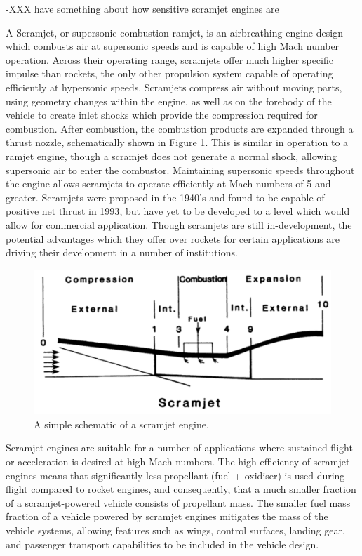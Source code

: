    -XXX have something about how sensitive scramjet engines are
    
    A Scramjet, or supersonic combustion ramjet, is an airbreathing engine design which combusts air at supersonic speeds and is capable of high Mach number operation. 
    Across their operating range, scramjets offer much higher specific impulse than rockets, the only other propulsion system capable of operating efficiently at hypersonic speeds\cite{Billig1993,Cook2003}.
    Scramjets compress air without moving parts, using geometry changes within the engine\cite{Curran2001a}, as well as on the forebody of the vehicle to create inlet shocks which provide the compression required for combustion\cite{Smart2012}. After combustion, the combustion products are expanded through a thrust nozzle, schematically shown in Figure \ref{fig:scramjet}. This is similar in operation to a ramjet engine, though a scramjet does not generate a normal shock, allowing supersonic air to enter the combustor. Maintaining supersonic speeds throughout the engine allows scramjets to operate efficiently at Mach numbers of 5 and greater. 
    Scramjets were proposed in the 1940's\cite{Curran2001} and found to be capable of positive net thrust in 1993\cite{Paull1993}, but have yet to be developed to a level which would allow for commercial application. 
    Though scramjets are still in-development, the potential advantages which they offer over rockets for certain applications are driving their development in a number of institutions\cite{Curran2001b}.
    \begin{figure}[ht]
    	\centering
    	\includegraphics[width=0.7\linewidth]{figures/2_literature-review/scramjet}
    	\caption{A simple schematic of a scramjet engine\cite{Heiser1994}.}
    	\label{fig:scramjet}
    \end{figure}
    
    Scramjet engines are suitable for a number of applications where sustained flight or acceleration is desired at high Mach numbers. 
    The high efficiency of scramjet engines means that significantly less propellant (fuel + oxidiser) is used during flight compared to rocket engines, and consequently, that a much smaller fraction of a scramjet-powered vehicle consists of propellant mass\cite{Curran2003}. 
    The smaller fuel mass fraction of a vehicle powered by scramjet engines mitigates the mass of the vehicle systems, allowing features such as wings, control surfaces, landing gear, and passenger transport capabilities to be included in the vehicle design\cite{Curran2003}. 
    
